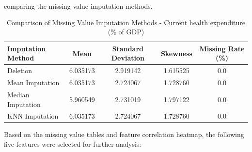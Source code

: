 \documentclass{article}
\begin{document}
comparing the missing value imputation methods.

\begin{table}[h]
    \centering
    \caption{Comparison of Missing Value Imputation Methods - Current health expenditure (\% of GDP)}
    \label{tab:imputation_comparison_health_exp}
    \begin{tabular}{|l|c|c|c|c|}
        \hline
        \textbf{Imputation Method} & \textbf{Mean} & \textbf{Standard Deviation} & \textbf{Skewness} & \textbf{Missing Rate (\%)} \\
        \hline
        Deletion & 6.035173 & 2.919142 & 1.615525 & 0.0 \\
        Mean Imputation & 6.035173 & 2.724067 & 1.728760 & 0.0 \\
        Median Imputation & 5.960549 & 2.731019 & 1.797122 & 0.0 \\
        KNN Imputation & 6.035173 & 2.724067 & 1.728760 & 0.0 \\
        \hline
    \end{tabular}
\end{table}



Based on the missing value tables and feature correlation heatmap, the following five features were selected for further analysis:
\end{document}
